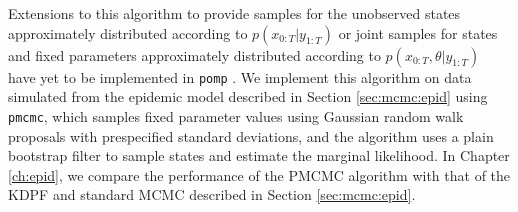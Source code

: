 Extensions to this algorithm to provide samples for the unobserved states approximately distributed according to $p(x_{0:T}|y_{1:T})$ or joint samples for states and fixed parameters approximately distributed according to $p(x_{0:T},\theta|y_{1:T})$ have yet to be implemented in {\tt pomp} \cite[Section 2.4.3][]{Andr:Douc:Hol:pmcmc:2010}. We implement this algorithm on data simulated from the epidemic model described in Section \ref{sec:mcmc:epid} using {\tt pmcmc}, which samples fixed parameter values using Gaussian random walk proposals with prespecified standard deviations, and the algorithm uses a plain bootstrap filter to sample states and estimate the marginal likelihood. In Chapter \ref{ch:epid}, we compare the performance of the PMCMC algorithm with that of the KDPF and standard MCMC described in Section \ref{sec:mcmc:epid}. 